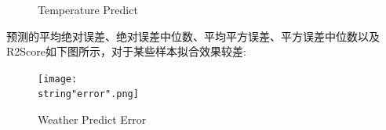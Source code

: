 \documentclass[UTF8]{ctexart}
\begin{document}
\begin{figure}[H]
{    }
    \caption{Temperature Predict}
    \label{fig:12}
\end{figure}

预测的平均绝对误差、绝对误差中位数、平均平方误差、平方误差中位数以及R2Score如下图所示，对于某些样本拟合效果较差:

\begin{figure}[H]
    \begin{center}
        \texttt{[image: \\string"error".png]}
    \caption{Weather Predict Error}
    \label{fig:13}
    \end{center}
    \end{figure}
\par


 

\end{document}
